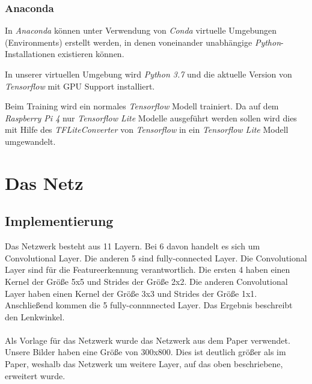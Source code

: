 \documentclass[a4paper, 12pt]{scrartcl}
\begin{document}
			\subsubsection{Anaconda}
			In \emph{Anaconda} können unter Verwendung von \emph{Conda} virtuelle Umgebungen (Environments) erstellt werden, in denen voneinander unabhängige \emph{Python}-Installationen existieren können. 
			
			In unserer virtuellen Umgebung wird \emph{Python 3.7} und die aktuelle Version von \emph{Tensorflow} mit GPU Support installiert.
			
			Beim Training wird ein normales \emph{Tensorflow} Modell trainiert. Da auf dem  \emph{Raspberry Pi 4} nur \emph{Tensorflow Lite} Modelle ausgeführt werden sollen wird dies mit Hilfe des \emph{TFLiteConverter} von  \emph{Tensorflow}  in ein \emph{Tensorflow Lite} Modell umgewandelt.
			
	
			
		\section{Das Netz}
			\subsection{Implementierung}
			Das Netzwerk besteht aus 11 Layern. Bei 6 davon handelt es sich um Convolutional Layer. Die anderen 5 sind fully-connected Layer. Die Convolutional Layer sind für die Featureerkennung verantwortlich. Die ersten 4 haben einen Kernel der Größe 5x5 und Strides der Größe 2x2. Die anderen Convolutional Layer haben einen Kernel der Größe 3x3 und Strides der Größe 1x1. Anschließend kommen die 5 fully-connnnected Layer. Das Ergebnis beschreibt den Lenkwinkel. \\ \\
			Als Vorlage für das Netzwerk wurde das Netzwerk aus dem Paper \cite{article} verwendet. Unsere Bilder haben eine Größe von 300x800. Dies ist deutlich größer als im Paper, weshalb das Netzwerk um weitere Layer, auf das oben beschriebene, erweitert wurde.
		
\end{document}
